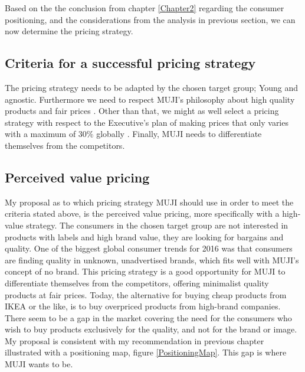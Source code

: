 Based on the the conclusion from chapter \ref{Chapter2} regarding the consumer positioning, and the considerations from the analysis in previous section, we can now determine the pricing strategy.  

\subsection{Criteria for a successful pricing strategy}
The pricing strategy needs to be adapted by the chosen target group; Young and agnostic. Furthermore we need to respect MUJI's philosophy about high quality products and fair prices \cite{FutureGrowth}. Other than that, we might as well select a pricing strategy with respect to the Executive's plan of making prices that only varies with a maximum of 30\% globally \cite{FutureGrowth}. Finally, MUJI needs to differentiate themselves from the competitors. 

\subsection{Perceived value pricing}
My proposal as to which pricing strategy MUJI should use in order to meet the criteria stated above, is the perceived value pricing, more specifically with a high-value strategy. The consumers in the chosen target group are not interested in products with labels and high brand value, they are looking for bargains and quality. One of the biggest global consumer trends for 2016 was that consumers are finding quality in unknown, unadvertised brands, which fits well with MUJI's concept of no brand. This pricing strategy is a good opportunity for MUJI to differentiate themselves from the competitors, offering minimalist quality products at fair prices. Today, the alternative for buying cheap products from IKEA or the like, is to buy overpriced products from high-brand companies. There seem to be a gap in the market covering the need for the consumers who wish to buy products exclusively for the quality, and not for the brand or image. My proposal is consistent with my recommendation in previous chapter illustrated with a positioning map, figure \ref{PositioningMap}. This gap is where MUJI wants to be.  